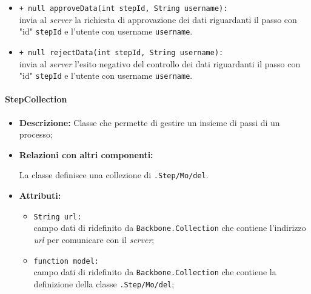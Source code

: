\begin{flushleft}
\begin{itemize}
\begin{sloppypar}
\begin{itemize}
\item \texttt{+ null approveData(int stepId, String username):}\\ invia al \textit{server} la richiesta di approvazione dei dati riguardanti il passo con "id" \texttt{stepId} e l'utente con username \texttt{username}.
\item \texttt{+ null rejectData(int stepId, String username):}\\ invia al \textit{server} l'esito negativo del controllo dei dati riguardanti il passo con "id" \texttt{stepId} e l'utente con username \texttt{username}.
\end{itemize}
\end{sloppypar}
\end{itemize}
\end{flushleft}

\paragraph{StepCollection}
\label{stepCollection}
\begin{flushleft}
\begin{itemize}
\item \textbf{Descrizione:} Classe che permette di gestire un insieme di passi di un processo;
\item \textbf{Relazioni con altri componenti:}
\begin{sloppypar}
La classe definisce una collezione di \texttt{\model{}.Step\fshyp{}Mo\fshyp{}del}.
\end{sloppypar}
\item \textbf{Attributi:}
\begin{sloppypar}
\begin{itemize}
\item \texttt{String url:}\\ campo dati di ridefinito da \texttt{Backbone.Collection} che contiene l'indirizzo \textit{url} per comunicare con il \textit{server};
\item \texttt{function model:}\\ campo dati di ridefinito da \texttt{Backbone.Collection} che contiene la definizione della classe \texttt{\model{}.Step\fshyp{}Mo\fshyp{}del};
\end{itemize}
\end{sloppypar}
\end{itemize}
\end{flushleft}